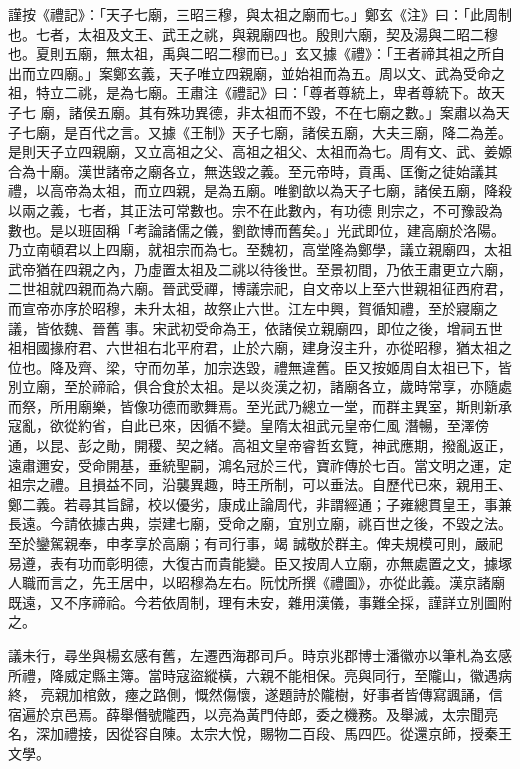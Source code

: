 \begin{pinyinscope}
 謹按《禮記》：「天子七廟，三昭三穆，與太祖之廟而七。」鄭玄《注》曰：「此周制也。七者，太祖及文王、武王之祧，與親廟四也。殷則六廟，契及湯與二昭二穆也。夏則五廟，無太祖，禹與二昭二穆而已。」玄又據《禮》：「王者禘其祖之所自出而立四廟。」案鄭玄義，天子唯立四親廟，並始祖而為五。周以文、武為受命之祖，特立二祧，是為七廟。王肅注《禮記》曰：「尊者尊統上，卑者尊統下。故天子七
 廟，諸侯五廟。其有殊功異德，非太祖而不毀，不在七廟之數。」案肅以為天子七廟，是百代之言。又據《王制》天子七廟，諸侯五廟，大夫三廟，降二為差。是則天子立四親廟，又立高祖之父、高祖之祖父、太祖而為七。周有文、武、姜嫄合為十廟。漢世諸帝之廟各立，無迭毀之義。至元帝時，貢禹、匡衡之徒始議其禮，以高帝為太祖，而立四親，是為五廟。唯劉歆以為天子七廟，諸侯五廟，降殺以兩之義，七者，其正法可常數也。宗不在此數內，有功德
 則宗之，不可豫設為數也。是以班固稱「考論諸儒之儀，劉歆博而舊矣。」光武即位，建高廟於洛陽。乃立南頓君以上四廟，就祖宗而為七。至魏初，高堂隆為鄭學，議立親廟四，太祖武帝猶在四親之內，乃虛置太祖及二祧以待後世。至景初間，乃依王肅更立六廟，二世祖就四親而為六廟。晉武受禪，博議宗祀，自文帝以上至六世親祖征西府君，而宣帝亦序於昭穆，未升太祖，故祭止六世。江左中興，賀循知禮，至於寢廟之議，皆依魏、晉舊
 事。宋武初受命為王，依諸侯立親廟四，即位之後，增祠五世祖相國掾府君、六世祖右北平府君，止於六廟，建身沒主升，亦從昭穆，猶太祖之位也。降及齊、梁，守而勿革，加宗迭毀，禮無違舊。臣又按姬周自太祖已下，皆別立廟，至於禘祫，俱合食於太祖。是以炎漢之初，諸廟各立，歲時常享，亦隨處而祭，所用廟樂，皆像功德而歌舞焉。至光武乃總立一堂，而群主異室，斯則新承寇亂，欲從約省，自此已來，因循不變。皇隋太祖武元皇帝仁風
 潛暢，至澤傍通，以昆、彭之勛，開稷、契之緒。高祖文皇帝睿哲玄覽，神武應期，撥亂返正，遠肅邇安，受命開基，垂統聖嗣，鴻名冠於三代，寶祚傳於七百。當文明之運，定祖宗之禮。且損益不同，沿襲異趣，時王所制，可以垂法。自歷代已來，親用王、鄭二義。若尋其旨歸，校以優劣，康成止論周代，非謂經通；子雍總貫皇王，事兼長遠。今請依據古典，崇建七廟，受命之廟，宜別立廟，祧百世之後，不毀之法。至於鑾駕親奉，申孝享於高廟；有司行事，竭
 誠敬於群主。俾夫規模可則，嚴祀易遵，表有功而彰明德，大復古而貴能變。臣又按周人立廟，亦無處置之文，據塚人職而言之，先王居中，以昭穆為左右。阮忱所撰《禮圖》，亦從此義。漢京諸廟既遠，又不序禘祫。今若依周制，理有未安，雜用漢儀，事難全採，謹詳立別圖附之。



 議未行，尋坐與楊玄感有舊，左遷西海郡司戶。時京兆郡博士潘徽亦以筆札為玄感所禮，降威定縣主簿。當時寇盜縱橫，六親不能相保。亮與同行，至隴山，徽遇病終，
 亮親加棺斂，瘞之路側，慨然傷懷，遂題詩於隴樹，好事者皆傳寫諷誦，信宿遍於京邑焉。薛舉僭號隴西，以亮為黃門侍郎，委之機務。及舉滅，太宗聞亮名，深加禮接，因從容自陳。太宗大悅，賜物二百段、馬四匹。從還京師，授秦王文學。




\end{pinyinscope}
